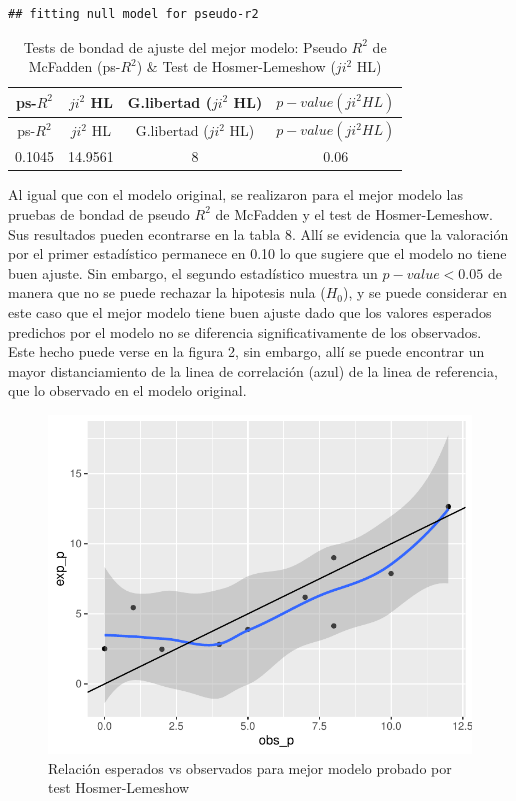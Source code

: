 \documentclass[
]{article}
\begin{document}
\begin{verbatim}
## fitting null model for pseudo-r2
\end{verbatim}

\begin{longtable}[]{@{}cccc@{}}
\caption{Tests de bondad de ajuste del mejor modelo: Pseudo \(R^2\) de
McFadden (ps-\(R^2\)) \& Test de Hosmer-Lemeshow (\(ji^2\)
HL)}\tabularnewline
\toprule
ps-\(R^2\) & \(ji^2\) HL & G.libertad (\(ji^2\) HL) &
\(p-value(ji^2 HL)\)\tabularnewline
\midrule
\endfirsthead
\toprule
ps-\(R^2\) & \(ji^2\) HL & G.libertad (\(ji^2\) HL) &
\(p-value(ji^2 HL)\)\tabularnewline
\midrule
\endhead
0.1045 & 14.9561 & 8 & 0.06\tabularnewline
\bottomrule
\end{longtable}

Al igual que con el modelo original, se realizaron para el mejor modelo
las pruebas de bondad de pseudo \(R^2\) de McFadden y el test de
Hosmer-Lemeshow. Sus resultados pueden econtrarse en la tabla 8. Allí se
evidencia que la valoración por el primer estadístico permanece en 0.10
lo que sugiere que el modelo no tiene buen ajuste. Sin embargo, el
segundo estadístico muestra un \(p-value < 0.05\) de manera que no se
puede rechazar la hipotesis nula (\(H_0\)), y se puede considerar en
este caso que el mejor modelo tiene buen ajuste dado que los valores
esperados predichos por el modelo no se diferencia significativamente de
los observados. Este hecho puede verse en la figura 2, sin embargo, allí
se puede encontrar un mayor distanciamiento de la linea de correlación
(azul) de la linea de referencia, que lo observado en el modelo
original.

\begin{figure}
\centering
\includegraphics{taller4_regresionlogist_files/figure-latex/gráfica de relación de esperados y observados MEJOR MODELO Hosmer-lemeshow-1.pdf}
\caption{Relación esperados vs observados para mejor modelo probado por
test Hosmer-Lemeshow}
\end{figure}
\end{document}
